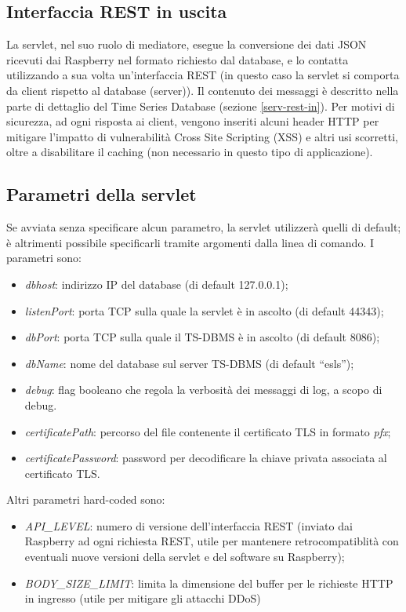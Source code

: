 \subsection{Interfaccia REST in uscita}
La servlet, nel suo ruolo di mediatore, esegue la conversione dei dati JSON ricevuti dai Raspberry nel formato richiesto dal database, e lo contatta utilizzando a sua volta un'interfaccia REST (in questo caso la servlet si comporta da client rispetto al database (server)).
Il contenuto dei messaggi è descritto nella parte di dettaglio del Time Series Database (sezione \ref{serv-rest-in}).
Per motivi di sicurezza, ad ogni risposta ai client, vengono inseriti alcuni header HTTP per mitigare l'impatto di vulnerabilità Cross Site Scripting (XSS) e altri usi scorretti, oltre a disabilitare il caching (non necessario in questo tipo di applicazione).

\subsection{Parametri della servlet}
Se avviata senza specificare alcun parametro, la servlet utilizzerà quelli di default; è altrimenti possibile specificarli tramite argomenti dalla linea di comando. I parametri sono:
\begin{itemize}
 \item \textit{dbhost}: indirizzo IP del database (di default 127.0.0.1);
 \item \textit{listenPort}: porta TCP sulla quale la servlet è in ascolto (di default 44343);
 \item \textit{dbPort}: porta TCP sulla quale il TS-DBMS è in ascolto (di default 8086);
 \item \textit{dbName}: nome del database sul server TS-DBMS (di default ``esls'');
 \item \textit{debug}: flag booleano che regola la verbosità dei messaggi di log, a scopo di debug.
 \item \textit{certificatePath}: percorso del file contenente il certificato TLS in formato \textit{pfx};
 \item \textit{certificatePassword}: password per decodificare la chiave privata associata al certificato TLS.
\end{itemize}
Altri parametri hard-coded sono:
\begin{itemize}
 \item \textit{API\_LEVEL}: numero di versione dell'interfaccia REST (inviato dai Raspberry ad ogni richiesta REST, utile per mantenere retrocompatiblità con eventuali nuove versioni della servlet e del software su Raspberry);
 \item \textit{BODY\_SIZE\_LIMIT}: limita la dimensione del buffer per le richieste HTTP in ingresso (utile per mitigare gli attacchi DDoS)
\end{itemize}

